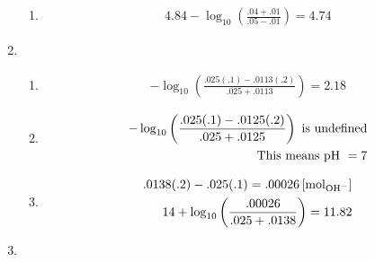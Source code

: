 \documentclass[12pt]{article}
\begin{document}
\begin{enumerate}
\begin{enumerate}
      \item

        \begin{equation}
          \begin{split}
            4.84-\log_{10}\left( \frac{.04+.01}{.05-.01}  \right)=4.74
          \end{split}
          \label{8}
        \end{equation}

    \end{enumerate}

  \item

    \begin{enumerate}

      \item 

        \begin{equation}
          \begin{split}
            -\log_{10}\left( \frac{.025(.1)-.0113(.2)}{.025+.0113} \right)=2.18
          \end{split}
          \label{9}
        \end{equation}

      \item

        \begin{equation}
          \begin{split}
            -\log_{10}\left( \frac{.025(.1)-.0125(.2)}{.025+.0125} \right)\text{ is undefined}\\
            \text{This means p\ce{H} } = 7\\
          \end{split}
          \label{10}
        \end{equation}

      \item

        \begin{equation}
          \begin{split}
            .0138(.2)-.025(.1)=.00026\left[ \si{\mole}_{\ce{OH-}} \right]\\
            14+\log_{10}\left( \frac{.00026}{.025+.0138} \right)= 11.82
          \end{split}
          \label{11}
        \end{equation}

    \end{enumerate}

  \item


\end{enumerate}
\end{document}
